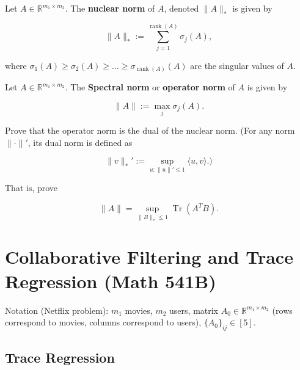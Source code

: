 \begin{definition}\label{statlearning.def.nuc.norm}

Let \(A \in \mathbb{R}^{m_1 \times m_2}\). The \textbf{nuclear norm} of \(A\), denoted \(\lVert A \rVert_*\) is given by

\[
\lVert A \rVert_* := \sum_{j=1}^{\operatorname{rank}(A)} \sigma_j(A), 
\]

where \(\sigma_1(A) \geq \sigma_2(A) \geq \ldots \geq \sigma_{\operatorname{rank}(A)}(A)\) are the singular values of \(A\).

\end{definition}

\begin{definition}\label{statlearning.def.spec.norm}

Let \(A \in \mathbb{R}^{m_1 \times m_2}\). The \textbf{Spectral norm} or \textbf{operator norm} of \(A\) is given by

\[
\lVert A \rVert := \max_j \sigma_j(A).
\]


\end{definition}

\begin{exercise}\label{statlearning.ex.nuc.norm.op.norm.dual}

Prove that the operator norm is the dual of the nuclear norm. (For any norm \(\lVert \cdot \rVert'\), its dual norm is defined as 

\[
\lVert v \rVert_*' := \sup_{u: \lVert u \rVert' \leq 1 } \langle u, v \rangle.)
\]

That is, prove

\[
\lVert A \rVert = \sup_{\lVert B \rVert_* \leq 1 } \operatorname{Tr}(A^T B).
\]

\end{exercise}

\section{Collaborative Filtering and Trace Regression (Math 541B)}

Notation (Netflix problem): \(m_1\) movies, \(m_2\) users, matrix \(A_0 \in \mathbb{R}^{m_1 \times m_2}\) (rows correspond to movies, columns correspond to users), \(\{A_0\}_{ij} \in [5]\). 

\subsection{Trace Regression}

